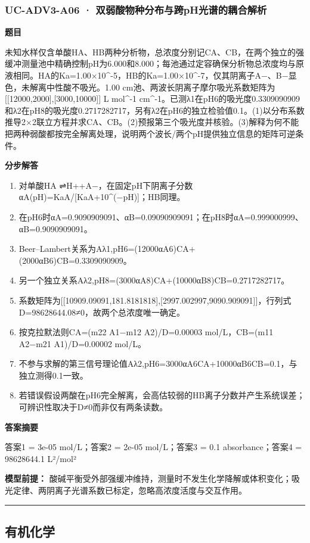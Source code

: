 \documentclass[UTF8,11pt,a4paper]{ctexart}
\begin{document}
\subsubsection*{UC-ADV3-A06 · 双弱酸物种分布与跨pH光谱的耦合解析}
\noindent\textbf{题目}\par
未知水样仅含单酸HA、HB两种分析物，总浓度分别记CA、CB，在两个独立的强缓冲测量池中精确控制pH为6.000和8.000；每池通过定容确保分析物总浓度均与原液相同。HA的Ka=1.00×10\textasciicircum{}-5，HB的Ka=1.00×10\textasciicircum{}-7，仅其阴离子A−、B−显色，未解离中性酸不吸光。1.00 cm池、两波长阴离子摩尔吸光系数矩阵为[[12000,2000],[3000,10000]] L mol\textasciicircum{}-1 cm\textasciicircum{}-1。已测λ1在pH6的吸光度0.3309090909和λ2在pH8的吸光度0.2717282717，另有λ2在pH6的独立检验值0.1。(1)以分布系数推导2×2联立方程并求CA、CB。(2)预报第三个吸光度并核验。(3)解释为何不能把两种弱酸都按完全解离处理，说明两个波长/两个pH提供独立信息的矩阵可逆条件。\par
\medskip\noindent\textbf{分步解答}
\begin{enumerate}
\item 对单酸HA ⇌H++A−，在固定pH下阴离子分数αA(pH)=KaA/[KaA+10\textasciicircum{}(−pH)]；HB同理。
\item 在pH6时αA=0.9090909091、αB=0.09090909091；在pH8时αA=0.999000999、αB=0.9090909091。
\item Beer–Lambert关系为Aλ1,pH6=(12000αA6)CA+(2000αB6)CB=0.3309090909。
\item 另一个独立关系Aλ2,pH8=(3000αA8)CA+(10000αB8)CB=0.2717282717。
\item 系数矩阵为[[10909.09091,181.8181818],[2997.002997,9090.909091]]，行列式D=98628644.08≠0，故两个总浓度唯一确定。
\item 按克拉默法则CA=(m22 A1−m12 A2)/D=0.00003 mol/L，CB=(m11 A2−m21 A1)/D=0.00002 mol/L。
\item 不参与求解的第三信号理论值Aλ2,pH6=3000αA6CA+10000αB6CB=0.1，与独立测得0.1一致。
\item 若错误假设两酸在pH6完全解离，会高估较弱的HB离子分数并产生系统误差；可辨识性取决于D≠0而非仅有两条读数。
\end{enumerate}
\noindent\textbf{答案摘要}\par
答案1 = 3e-05 mol/L；答案2 = 2e-05 mol/L；答案3 = 0.1 absorbance；答案4 = 98628644.1 L²/mol²\par
\noindent\textbf{模型前提：}
酸碱平衡受外部强缓冲维持，测量时不发生化学降解或体积变化；吸光定律、两阴离子光谱系数已标定，忽略高浓度活度与交互作用。\par
\medskip\hrule\medskip
\subsection*{有机化学}
\end{document}
